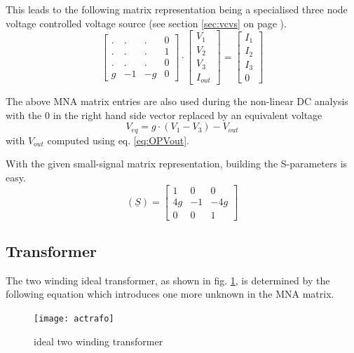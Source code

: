 This leads to the following matrix representation being a specialised
three node voltage controlled voltage source (see section
\ref{sec:vcvs} on page \pageref{sec:vcvs}).
\begin{equation}
\begin{bmatrix}
.&.&.& 0\\
.&.&.& 1\\
.&.&.& 0\\
g & -1 & -g & 0
\end{bmatrix}
\cdot
\begin{bmatrix}
V_{1}\\
V_{2}\\
V_{3}\\
I_{out}
\end{bmatrix}
=
\begin{bmatrix}
I_{1}\\
I_{2}\\
I_{3}\\
0
\end{bmatrix}
\end{equation}

The above MNA matrix entries are also used during the non-linear DC
analysis with the 0 in the right hand side vector replaced by an
equivalent voltage
\begin{equation}
V_{eq} = g\cdot \left(V_1 - V_3\right) - V_{out}
\end{equation}
with $V_{out}$ computed using eq. \eqref{eq:OPVout}.

\addvspace{12pt}

With the given small-signal matrix representation, building the
S-parameters is easy.
\begin{equation}
(\underline{S}) =
\begin{bmatrix}
 1  &  0 & 0  \\
 4g & -1 & -4g\\
 0  &  0 &  1
\end{bmatrix}
\end{equation}

\subsection{Transformer}

The two winding ideal transformer, as shown in fig.
\ref{fig:actrafo}, is determined by the following equation which
introduces one more unknown in the MNA matrix.

\begin{figure}[ht]
\begin{center}
\texttt{[image: actrafo]}
\end{center}
\caption{ideal two winding transformer}
\label{fig:actrafo}
\end{figure}
\FloatBarrier

